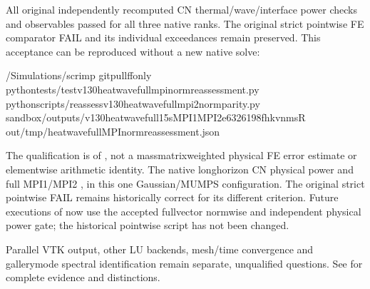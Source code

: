 \documentclass[letterpaper,10pt,english]{sphinxmanual}
\begin{document}
\sphinxAtStartPar
All original independently recomputed
CN thermal/wave/interface power checks
and  observables
passed for all three native ranks.
The original strict pointwise FE
comparator FAIL and its 
individual exceedances remain preserved.
This acceptance can be reproduced
without a new native solve:

\begin{sphinxVerbatim}[commandchars=\\\{\}]
\PYGZti{}/Simulations/scrimp
gitpull\PYGZhy{}\PYGZhy{}ff\PYGZhy{}only
pythontests/test\PYGZus{}v130\PYGZus{}heat\PYGZus{}wave\PYGZus{}full\PYGZus{}mpi\PYGZus{}norm\PYGZus{}reassessment.py
pythonscripts/reassess\PYGZhy{}v130\PYGZhy{}heat\PYGZhy{}wave\PYGZhy{}full\PYGZhy{}mpi2\PYGZhy{}norm\PYGZhy{}parity.py
sandbox/outputs/v130\PYGZhy{}heat\PYGZhy{}wave\PYGZhy{}full\PYGZhy{}15s\PYGZhy{}MPI1\PYGZhy{}MPI2\PYGZhy{}e6326198\PYGZhy{}fhkvnmsR
\PYGZhy{}\PYGZhy{}out/tmp/heat\PYGZhy{}wave\PYGZhy{}full\PYGZhy{}MPI\PYGZhy{}norm\PYGZhy{}reassessment.json
\end{sphinxVerbatim}

\sphinxAtStartPar
The qualification is of ,
not a mass\sphinxhyphen{}matrix\sphinxhyphen{}weighted physical FE
error estimate or elementwise arithmetic
identity. The native long\sphinxhyphen{}horizon CN
physical power and full MPI1/MPI2
,
in this one Gaussian/MUMPS configuration.
The original strict pointwise FAIL
remains historically correct for its
different criterion. Future executions
of 
now use the accepted full\sphinxhyphen{}vector normwise
and independent physical power gate;
the historical pointwise script has not
been changed.

\sphinxAtStartPar
Parallel VTK output, other LU backends,
mesh/time convergence and gallery\sphinxhyphen{}mode
spectral identification remain separate,
unqualified questions. See
for complete evidence and distinctions.

\sphinxstepscope
\end{document}
